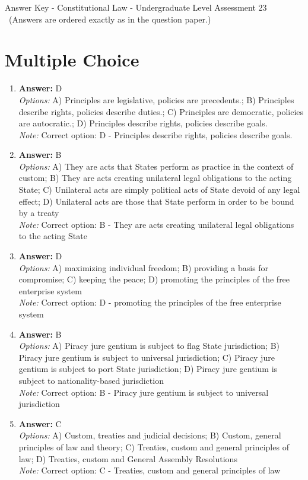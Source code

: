 \documentclass[12pt]{article}
\begin{document}
\begin{center}
Answer Key - Constitutional Law - Undergraduate Level Assessment 23 \
\small (Answers are ordered exactly as in the question paper.)
\end{center}

\section*{Multiple Choice}
\begin{enumerate}[label=\arabic*.]
\item \textbf{Answer:} D
\\ \textit{Options:} A) Principles are legislative, policies are precedents.; B) Principles describe rights, policies describe duties.; C) Principles are democratic, policies are autocratic.; D) Principles describe rights, policies describe goals.
\\ \textit{Note:} Correct option: D - Principles describe rights, policies describe goals.
\item \textbf{Answer:} B
\\ \textit{Options:} A) They are acts that States perform as practice in the context of custom; B) They are acts creating unilateral legal obligations to the acting State; C) Unilateral acts are simply political acts of State devoid of any legal effect; D) Unilateral acts are those that State perform in order to be bound by a treaty
\\ \textit{Note:} Correct option: B - They are acts creating unilateral legal obligations to the acting State
\item \textbf{Answer:} D
\\ \textit{Options:} A) maximizing individual freedom; B) providing a basis for compromise; C) keeping the peace; D) promoting the principles of the free enterprise system
\\ \textit{Note:} Correct option: D - promoting the principles of the free enterprise system
\item \textbf{Answer:} B
\\ \textit{Options:} A) Piracy jure gentium is subject to flag State jurisdiction; B) Piracy jure gentium is subject to universal jurisdiction; C) Piracy jure gentium is subject to port State jurisdiction; D) Piracy jure gentium is subject to nationality-based jurisdiction
\\ \textit{Note:} Correct option: B - Piracy jure gentium is subject to universal jurisdiction
\item \textbf{Answer:} C
\\ \textit{Options:} A) Custom, treaties and judicial decisions; B) Custom, general principles of law and theory; C) Treaties, custom and general principles of law; D) Treaties, custom and General Assembly Resolutions
\\ \textit{Note:} Correct option: C - Treaties, custom and general principles of law
\end{enumerate}
\end{document}
